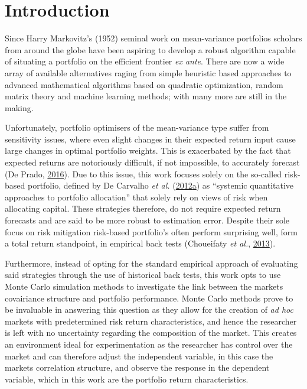 \documentclass[11pt,preprint, authoryear]{elsarticle}
\numberwithin{equation}{section}
\numberwithin{figure}{section}
\numberwithin{table}{section}
\begin{document}
\hypertarget{introduction}{%
\section{\texorpdfstring{Introduction
\label{Introduction}}{Introduction }}\label{introduction}}

Since Harry Markovitz's (1952) seminal work on mean-variance portfolios
scholars from around the globe have been aspiring to develop a robust
algorithm capable of situating a portfolio on the efficient frontier
\emph{ex ante}. There are now a wide array of available alternatives
raging from simple heuristic based approaches to advanced mathematical
algorithms based on quadratic optimization, random matrix theory and
machine learning methods; with many more are still in the making.

Unfortunately, portfolio optimisers of the mean-variance type suffer
from sensitivity issues, where even slight changes in their expected
return input cause large changes in optimal portfolio weights. This is
exacerbated by the fact that expected returns are notoriously difficult,
if not impossible, to accurately forecast (De Prado,
\protect\hyperlink{ref-lopez}{2016}). Due to this issue, this work
focuses solely on the so-called risk-based portfolio, defined by De
Carvalho \emph{et al.}
(\protect\hyperlink{ref-leote}{2012}\protect\hyperlink{ref-leote}{a}) as
``systemic quantitative approaches to portfolio allocation'' that solely
rely on views of risk when allocating capital. These strategies
therefore, do not require expected return forecasts and are said to be
more robust to estimation error. Despite their sole focus on risk
mitigation risk-based portfolio's often perform surprising well, form a
total return standpoint, in empirical back tests (Choueifaty \emph{et
al.}, \protect\hyperlink{ref-choueifaty2013}{2013}).

Furthermore, instead of opting for the standard empirical approach of
evaluating said strategies through the use of historical back tests,
this work opts to use Monte Carlo simulation methods to investigate the
link between the markets covairiance structure and portfolio
performance. Monte Carlo methods prove to be invaluable in answering
this question as they allow for the creation of \emph{ad hoc} markets
with predetermined risk return characteristics, and hence the researcher
is left with no uncertainty regarding the composition of the market.
This creates an environment ideal for experimentation as the researcher
has control over the market and can therefore adjust the independent
variable, in this case the markets correlation structure, and observe
the response in the dependent variable, which in this work are the
portfolio return characteristics.
\end{document}

